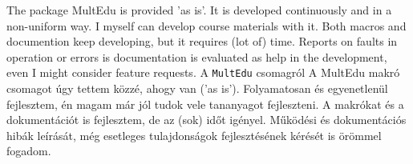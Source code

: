 {
The package \gls{MultEdu} is provided 'as is'. It is developed continuously
and in a non-uniform way. I myself can develop course materials with it.
Both macros and documention keep developing, but it requires (lot of) time.
Reports on faults in operation or errors is documentation is evaluated
as help in the development, even I might consider feature requests.
}
{A \lstinline|MultEdu| csomagról}
{
A \gls{MultEdu} makró csomagot úgy tettem közzé, ahogy van ('as is').
Folyamatosan és egyenetlenül fejlesztem, én magam már jól tudok vele
tananyagot fejleszteni. A makrókat és a dokumentációt is fejlesztem,
de az (sok) időt igényel.
Működési és dokumentációs hibák leírását,
még esetleges tulajdonságok fejlesztésének kérését is örömmel fogadom.
}